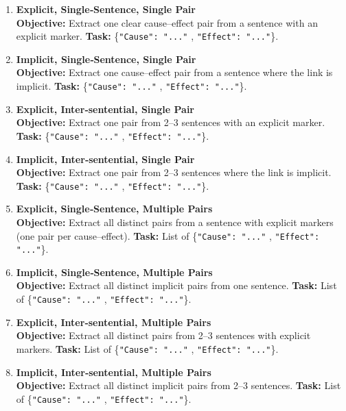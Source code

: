 \documentclass[conference]{IEEEtran}
\begin{document}
\begin{enumerate}
  \item \textbf{Explicit, Single‑Sentence, Single Pair}\\
    \textbf{Objective:} Extract one clear cause–effect pair from a sentence with an explicit marker.  
    \textbf{Task:} \{\texttt{"Cause": "..."} , \texttt{"Effect": "..."}\}.
  \item \textbf{Implicit, Single‑Sentence, Single Pair}\\
    \textbf{Objective:} Extract one cause–effect pair from a sentence where the link is implicit.  
    \textbf{Task:} \{\texttt{"Cause": "..."} , \texttt{"Effect": "..."}\}.
  \item \textbf{Explicit, Inter‑sentential, Single Pair}\\
    \textbf{Objective:} Extract one pair from 2–3 sentences with an explicit marker.  
    \textbf{Task:} \{\texttt{"Cause": "..."} , \texttt{"Effect": "..."}\}.
  \item \textbf{Implicit, Inter‑sentential, Single Pair}\\
    \textbf{Objective:} Extract one pair from 2–3 sentences where the link is implicit.  
    \textbf{Task:} \{\texttt{"Cause": "..."} , \texttt{"Effect": "..."}\}.
  \item \textbf{Explicit, Single‑Sentence, Multiple Pairs}\\
    \textbf{Objective:} Extract all distinct pairs from a sentence with explicit markers (one pair per cause–effect).  
    \textbf{Task:} List of \{\texttt{"Cause": "..."} , \texttt{"Effect": "..."}\}.
  \item \textbf{Implicit, Single‑Sentence, Multiple Pairs}\\
    \textbf{Objective:} Extract all distinct implicit pairs from one sentence.  
    \textbf{Task:} List of \{\texttt{"Cause": "..."} , \texttt{"Effect": "..."}\}.
  \item \textbf{Explicit, Inter‑sentential, Multiple Pairs}\\
    \textbf{Objective:} Extract all distinct pairs from 2–3 sentences with explicit markers.  
    \textbf{Task:} List of \{\texttt{"Cause": "..."} , \texttt{"Effect": "..."}\}.
  \item \textbf{Implicit, Inter‑sentential, Multiple Pairs}\\
    \textbf{Objective:} Extract all distinct implicit pairs from 2–3 sentences.  
    \textbf{Task:} List of \{\texttt{"Cause": "..."} , \texttt{"Effect": "..."}\}.
\end{enumerate}
\end{document}
